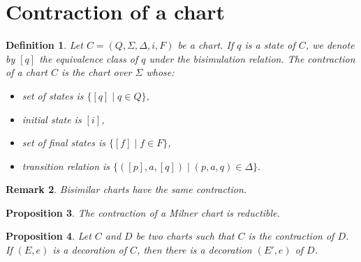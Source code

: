 \documentclass{article}
\newtheorem{definition}{Definition}[section]
\newtheorem{proposition}[definition]{Proposition}
\newtheorem{remark}[definition]{Remark}
\begin{document}
\section{Contraction of a chart}

\begin{definition}
    Let $C=(Q,\Sigma,\Delta,i,F)$ be a chart. If $q$ is a state of $C$, we denote by $[q]$ the equivalence class of
     $q$ under the bisimulation relation. 
     The \emph{contraction} of a chart $C$ is the chart over $\Sigma$ whose:
     \begin{itemize}
         \item set of states is $\{ [q] \mid q \in Q \}$,
         \item initial state is $[i]$,
         \item set of final states is $\{ [f] \mid f \in F \}$,
         \item transition relation  is $\{ ([p], a, [q]) \mid (p,a,q) \in \Delta\}.$
     \end{itemize}
    \end{definition}

    \begin{remark}
        Bisimilar charts have the same contraction. ~\label{remark:bisimilar-have-same-contraction}
    \end{remark}

    \begin{proposition}
        The contraction of a Milner chart is reductible. ~\label{prop:contraction-of-Milner-is-reductible}
    \end{proposition}

\begin{proposition}
     Let $C$ and $D$ be two charts such that $C$ is the contraction of $D$.
    If  $(E,e)$ is a decoration of $C$, then there is a decoration $(E', e)$ of $D$. ~\label{prop:expansion-preserves-decorability}
\end{proposition}
\end{document}
